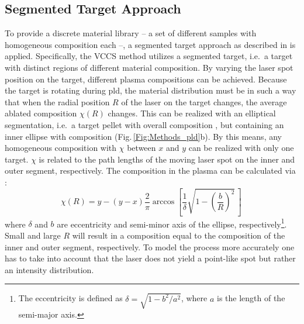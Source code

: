\subsection{Segmented Target Approach}\label{Sec:Methods_VCCS}
To provide a discrete material library -- a set of different samples with homogeneous composition each --, a segmented target approach as described in \textcite{wenckstern2020} is applied.
Specifically, the \gls{VCCS} method utilizes a segmented target, i.e.\ a target with distinct regions of different material composition.
By varying the laser spot position on the target, different plasma compositions can be achieved.
Because the target is rotating during \gls{pld}, the material distribution must be in such a way that when the radial position $R$ of the laser on the target changes, the average ablated composition $\chi(R)$ changes.
This can be realized with an elliptical segmentation, i.e.\ a target pellet with overall composition , but containing an inner ellipse with composition  (Fig.\,\ref{Fig:Methods_pld}b).
By this means, any homogeneous composition  with $\chi$ between $x$ and $y$ can be realized with only one target.
$\chi$ is related to the path lengths of the moving laser spot on the inner and outer segment, respectively.
The composition in the plasma can be calculated via \cite{wenckstern2020}:
\begin{equation}\label{Equ:Methods_composition}
    \chi(R) = y-(y-x)\frac{2}{\pi}\arccos\left[\frac{1}{\delta}\sqrt{1-\left(\frac{b}{R}\right)^2}\,\right]\,
\end{equation}
where $\delta$ and $b$ are eccentricity and semi-minor axis of the ellipse, respectively\footnote{
    The eccentricity is defined as $\delta=\sqrt{1-b^2/a^2}$, where $a$ is the length of the semi-major axis.
}.
Small and large $R$ will result in a composition equal to the composition of the inner and outer segment, respectively.
To model the process more accurately one has to take into account that the laser does not yield a point-like spot but rather an intensity distribution.
